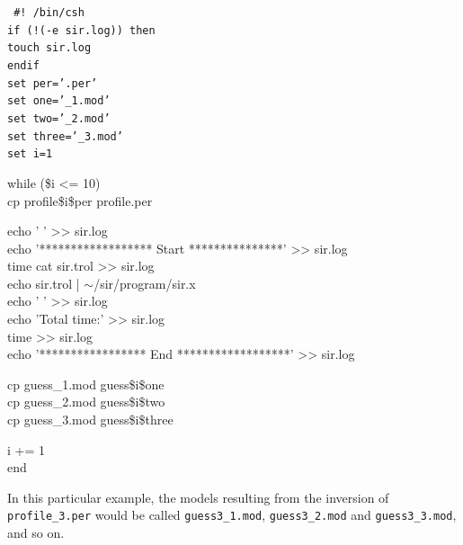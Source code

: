 {\tt 
\noindent       \#! /bin/csh  \\
\noindent       if (!(-e sir.log)) then  \\
\hspace*{2em}      touch sir.log   \\
                endif  \\
		set per='.per'      \\
                set one='\_1.mod'   \\
                set two='\_2.mod'   \\
                set three='\_3.mod'   \\
                set i=1    

\noindent       while (\$i <= 10)  \\
\hspace*{2em}      cp profile\$i\$per profile.per

\noindent  \hspace*{2em} echo ' ' >> sir.log   \\
\hspace*{2em}   echo '******************  Start ***************' >> sir.log  \\
\hspace*{2em}   time cat sir.trol >> sir.log   \\
\hspace*{2em}   echo sir.trol | $\sim$/sir/program/sir.x  \\
\hspace*{2em}   echo ' ' >> sir.log    \\
\hspace*{2em}   echo 'Total time:' >> sir.log \\ 
\hspace*{2em}   time >> sir.log  \\
\hspace*{2em}   echo '*****************  End ******************' >> sir.log  

\noindent  \hspace*{2em} cp guess\_1.mod guess\$i\$one  \\
\hspace*{2em} cp guess\_2.mod guess\$i\$two  \\
\hspace*{2em} cp guess\_3.mod guess\$i\$three  

\noindent  \@ i += 1  \\
end \\ }

In this particular example, the models resulting from the inversion
of {\tt profile\_3.per} would be called {\tt guess3\_1.mod}, 
{\tt guess3\_2.mod} and {\tt guess3\_3.mod}, and so on. 


